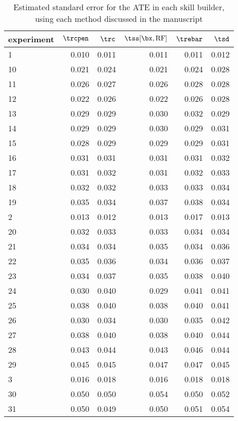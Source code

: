 \documentclass[12pt]{article}\usepackage[]{graphicx}\usepackage[]{color}
\begin{document}
\begin{table}
\caption{\label{tab:tab:SEs}Estimated standard error for the ATE in each skill builder, using each method discussed in the manuscript}
\centering
\begin{tabular}[t]{l|r|r|r|r|r}
\hline
experiment & $\trcpen$ & $\trc$ & $\tss[\bx,\mathrm{RF}]$ & $\trebar$ & $\tsd$\\
\hline
1 & 0.010 & 0.011 & 0.011 & 0.011 & 0.012\\
\hline
10 & 0.021 & 0.024 & 0.021 & 0.024 & 0.028\\
\hline
11 & 0.026 & 0.027 & 0.026 & 0.028 & 0.028\\
\hline
12 & 0.022 & 0.026 & 0.022 & 0.026 & 0.028\\
\hline
13 & 0.029 & 0.029 & 0.030 & 0.032 & 0.029\\
\hline
14 & 0.029 & 0.029 & 0.030 & 0.029 & 0.031\\
\hline
15 & 0.028 & 0.029 & 0.029 & 0.029 & 0.031\\
\hline
16 & 0.031 & 0.031 & 0.031 & 0.031 & 0.032\\
\hline
17 & 0.031 & 0.032 & 0.031 & 0.032 & 0.033\\
\hline
18 & 0.032 & 0.032 & 0.033 & 0.033 & 0.034\\
\hline
19 & 0.035 & 0.034 & 0.037 & 0.038 & 0.034\\
\hline
2 & 0.013 & 0.012 & 0.013 & 0.017 & 0.013\\
\hline
20 & 0.032 & 0.033 & 0.033 & 0.034 & 0.034\\
\hline
21 & 0.034 & 0.034 & 0.035 & 0.034 & 0.036\\
\hline
22 & 0.035 & 0.036 & 0.034 & 0.036 & 0.037\\
\hline
23 & 0.034 & 0.037 & 0.035 & 0.038 & 0.040\\
\hline
24 & 0.030 & 0.040 & 0.029 & 0.041 & 0.041\\
\hline
25 & 0.038 & 0.040 & 0.038 & 0.040 & 0.041\\
\hline
26 & 0.030 & 0.034 & 0.030 & 0.035 & 0.042\\
\hline
27 & 0.038 & 0.040 & 0.038 & 0.040 & 0.044\\
\hline
28 & 0.043 & 0.044 & 0.043 & 0.046 & 0.044\\
\hline
29 & 0.045 & 0.045 & 0.047 & 0.047 & 0.045\\
\hline
3 & 0.016 & 0.018 & 0.016 & 0.018 & 0.018\\
\hline
30 & 0.050 & 0.050 & 0.054 & 0.050 & 0.052\\
\hline
31 & 0.050 & 0.049 & 0.050 & 0.051 & 0.054\\

\end{tabular}
\end{table}
\end{document}

